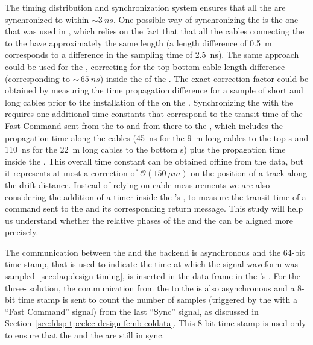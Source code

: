 The timing distribution and synchronization system ensures that
all the  are synchronized to within $\sim\SI{3}{ns}$. 
One possible way of synchronizing the  is the one
that was used in , which relies on the fact that 
that all the cables connecting the  to the
 have approximately the same length (a length 
difference of \SI{0.5}{m} corresponds to a difference in the
sampling time of \SI{2.5}{ns}). The same approach could be used
for the  , correcting for the top-bottom 
 cable length difference (corresponding to $\sim\,\SI{65}{ns}$) 
inside the  of the . The exact correction
factor could be obtained by measuring the time propagation 
difference for a sample of short and long cables prior to the 
installation of the  on the . 
Synchronizing the  with the  requires one
additional time constants that correspond to the transit 
time of the Fast Command sent from the  to
 and from there to the ,
which includes the propagation time along the cables
(\SI{45}{ns} for the \SI{9}{m} long cables to the top s
and \SI{110}{ns} for the \SI{22}{m} long cables to the bottom s) 
plus the propagation time inside the . This overall 
time constant can be obtained offline from the data, but it represents 
at most a correction of $\mathcal{O}(\SI{150}{\mu m})$ on the 
position of a track along the drift distance.
Instead of relying on cable measurements we are also considering
the addition of a timer inside the 's ,
to measure the transit time of a command
sent to the  and its corresponding return
message. This study will help us understand whether the 
relative phases of the  and the  
can be aligned more precisely.

The communication between the  and the  
backend is asynchronous and the \num{64}-bit time-stamp, that
is used to indicate the time at which the signal waveform was
sampled~\ref{sec:daq:design-timing}, is inserted in the data frame
in the 's . 
For the three- solution, the communication
from the  to the  is also
asynchronous and a \num{8}-bit time stamp is sent to
count the number of  samples (triggered by
the  with a ``Fast Command'' signal) from the last
``Sync'' signal, as discussed in Section~\ref{sec:fdsp-tpcelec-design-femb-coldata}.
This \num{8}-bit time stamp is used only to ensure
that the  and the  are
still in sync. 

